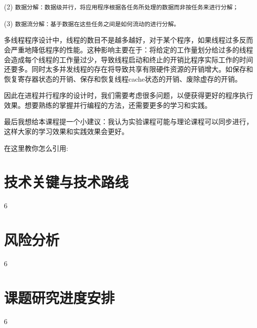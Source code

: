 \documentclass[supercite]{Experimental_Report}
\theoremstyle{definition}
\begin{document}
(2) \texttt{数据分解：数据级并行，将应用程序根据各任务所处理的数据而非按任务来进行分解；}

(3) \texttt{数据流分解：基于数据在这些任务之间是如何流动的进行分解。}

多线程程序设计中，线程的数目不是越多越好，对于某个程序，如果线程过多反而会严重地降低程序的性能。这种影响主要在于：将给定的工作量划分给过多的线程会造成每个线程的工作量过少，导致线程启动和终止的开销比程序实际工作的时间还要多。同时太多并发线程的存在将导致共享有限硬件资源的开销增大。如保存和恢复寄存器状态的开销、保存和恢复线程cache状态的开销、废除虚存的开销。

因此在进程并行程序的设计时，我们需要考虑很多问题，以便获得更好的程序执行效果。想要熟练的掌握并行编程的方法，还需要更多的学习和实践。

最后我想给本课程提一个小建议：我认为实验课程可能与理论课程可以同步进行，这样大家的学习效果和实践效果会更好。

在这里教你怎么引用:\cite{ref1}


\section{技术关键与技术路线}
6
\section{风险分析}
6
\section{课题研究进度安排}
6
\end{document}
